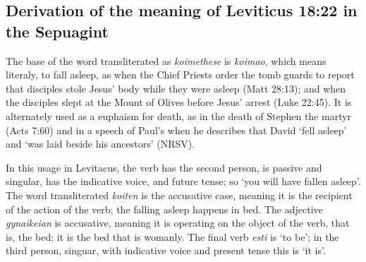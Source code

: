 \documentclass[10pt]{article}
\begin{document}
\subsection{Derivation of the meaning of Leviticus 18:22 in the Sepuagint}\label{A}
The base of the word transliterated as \textit{koimethese} is \textit{koimao}, which means literaly, to fall asleep, as when the Chief Priests order the tomb guards to report that disciples stole Jesus' body while they were asleep (Matt 28:13); and when the disciples slept at the Mount of Olives before Jesus' arrest (Luke 22:45). It is alternately used as a euphaism for death, as in the death of Stephen the martyr (Acts 7:60) and in a speech of Paul's when he describes that David `fell asleep' and `was laid beside his ancestors' (NRSV).

In this usage in Levitacus, the verb has the second person, is passive and singular, has the indicative voice, and future tense; so `you will have fallen asleep'. The word transliterated \textit{koiten} is the accusative case, meaning it is the recipient of the action of the verb; the falling asleep happens in bed. The adjective \textit{gynaikeian} is accusative, meaning it is operating on the object of the verb, that is, the bed; it is the bed that is womanly. The final verb \textit{esti} is `to be'; in the third person, singuar, with indicative voice and present tense this is `it is'.
\end{document}
